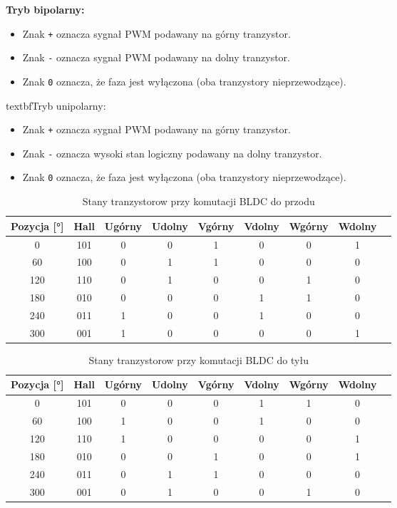 \documentclass[11pt]{article}
\begin{document}
\textbf{Tryb bipolarny:}
\begin{itemize}
\item Znak \texttt{+} oznacza sygnał PWM podawany na górny tranzystor.
\item Znak \texttt{-} oznacza sygnał PWM podawany na dolny tranzystor.
\item Znak \texttt{0} oznacza, że faza jest wyłączona (oba tranzystory nieprzewodzące).
\end{itemize}

textbf{Tryb unipolarny:}
\begin{itemize}
\item Znak \texttt{+} oznacza sygnał PWM podawany na górny tranzystor.
\item Znak \texttt{-} oznacza wysoki stan logiczny podawany na dolny tranzystor.
\item Znak \texttt{0} oznacza, że faza jest wyłączona (oba tranzystory nieprzewodzące).
\end{itemize}

\begin{table}[H]
\centering
\begin{tabular}{|c|c|c|c|c|c|c|c|c|}
\hline
Pozycja [°] & Hall & Ugórny & Udolny & Vgórny & Vdolny & Wgórny & Wdolny \\
\hline
0   & 101 & 0 & 0 & 1 & 0 & 0 & 1 \\
\hline
60  & 100 & 0 & 1 & 1 & 0 & 0 & 0 \\
\hline
120 & 110 & 0 & 1 & 0 & 0 & 1 & 0 \\
\hline
180 & 010 & 0 & 0 & 0 & 1 & 1 & 0 \\
\hline
240 & 011 & 1 & 0 & 0 & 1 & 0 & 0 \\
\hline
300 & 001 & 1 & 0 & 0 & 0 & 0 & 1 \\
\hline
\end{tabular}
\caption{Stany tranzystorow przy komutacji BLDC do przodu}
\end{table}

\begin{table}[H]
\centering
\begin{tabular}{|c|c|c|c|c|c|c|c|c|}
\hline
Pozycja [°] & Hall & Ugórny & Udolny & Vgórny & Vdolny & Wgórny & Wdolny \\
\hline
0   & 101 & 0 & 0 & 0 & 1 & 1 & 0 \\
\hline
60  & 100 & 1 & 0 & 0 & 1 & 0 & 0 \\
\hline
120 & 110 & 1 & 0 & 0 & 0 & 0 & 1 \\
\hline
180 & 010 & 0 & 0 & 1 & 0 & 0 & 1 \\
\hline
240 & 011 & 0 & 1 & 1 & 0 & 0 & 0 \\
\hline
300 & 001 & 0 & 1 & 0 & 0 & 1 & 0 \\
\hline
\end{tabular}
\caption{Stany tranzystorow przy komutacji BLDC do tyłu}
\end{table}
\end{document}
